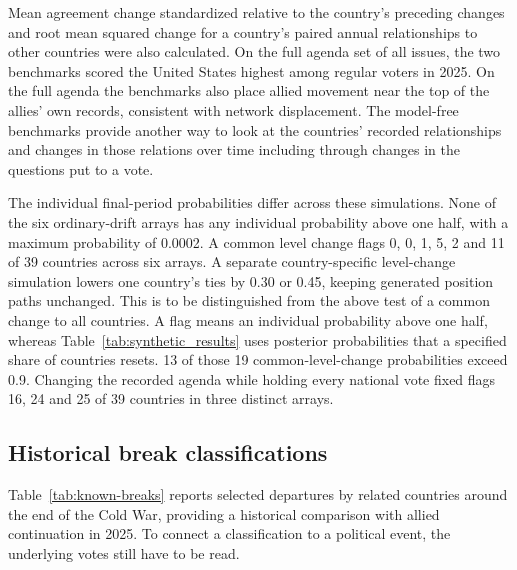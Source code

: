 \documentclass[10pt,authoryear]{elsarticle}
\begin{document}
Mean agreement change standardized relative to the country’s preceding changes and root mean squared change for a country’s paired annual relationships to other countries were also calculated. On the full agenda set of all issues, the two benchmarks scored the United States highest among regular voters in 2025. On the full agenda the benchmarks also place allied movement near the top of the allies’ own records, consistent with network displacement. The model-free benchmarks provide another way to look at the countries’ recorded relationships and changes in those relations over time including through changes in the questions put to a vote.

The individual final-period probabilities differ across these simulations. None of the six ordinary-drift arrays has any individual probability above one half, with a maximum probability of 0.0002. A common level change flags 0, 0, 1, 5, 2 and 11 of 39 countries across six arrays. A separate country-specific level-change simulation lowers one country’s ties by 0.30 or 0.45, keeping generated position paths unchanged. This is to be distinguished from the above test of a common change to all countries. A flag means an individual probability above one half, whereas Table~\ref{tab:synthetic_results} uses posterior probabilities that a specified share of countries resets. 13 of those 19 common-level-change probabilities exceed 0.9. Changing the recorded agenda while holding every national vote fixed flags 16, 24 and 25 of 39 countries in three distinct arrays. 

\subsection{Historical break classifications}

Table~\ref{tab:known-breaks} reports selected departures by related countries around the end of the Cold War, providing a historical comparison with allied continuation in 2025. To connect a classification to a political event, the underlying votes still have to be read.
\end{document}
